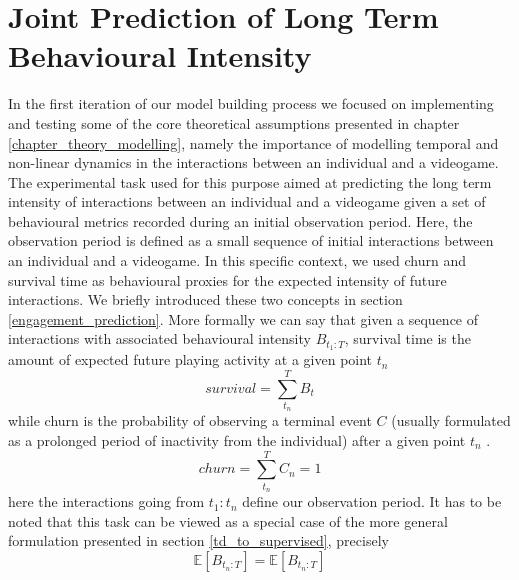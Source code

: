 \section{Joint Prediction of Long Term Behavioural Intensity}
\label{model_architecture_1}
In the first iteration of our model building process we focused on implementing and testing some of the core theoretical assumptions presented in chapter \ref{chapter_theory_modelling}, namely the importance of modelling temporal and non-linear dynamics in the interactions between an individual and a videogame. The experimental task used for this purpose aimed at predicting the long term intensity of interactions between an individual and a videogame given a set of behavioural metrics recorded during an initial observation period. Here, the observation period is defined as a small sequence of initial interactions between an individual and a videogame. In this specific context, we used churn and survival time as behavioural proxies for the expected intensity of future interactions. We briefly introduced these two concepts in section \ref{engagement_prediction}. More formally we can say that given a sequence of interactions with associated behavioural intensity $B_{t_1 : T}$, survival time is the amount of expected future playing activity at a given point $t_n$ \cite{ perianez2016churn, demediuk2018player, bertens2017games, kim2017churn, viljanen2018playtime}
\begin{equation}
\label{eq_survival}
    survival = \sum_{t_n}^{T}B_t
\end{equation}
while churn is the probability of observing a terminal event $C$ (usually formulated as a prolonged period of inactivity from the individual) after a given point $t_n$ \cite{hadiji2014predicting,runge2014churn, drachen2016rapid,milovsevic2017early, kim2017churn}.
\begin{equation}
\label{eq_churn}
    churn = \sum_{t_n}^{T}C_n = 1
\end{equation}
here the interactions going from $t_1: t_n$ define our observation period. It has to be noted that this task can be viewed as a special case of the more general formulation presented in section \ref{td_to_supervised}, precisely 
\begin{equation}
\label{rnn_1_exp}
   \mathbb{E}[B_{t_n : T}] = \mathbb{E}[B_{t_n : T}]
\end{equation}



